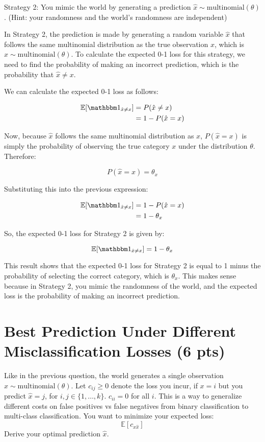 \documentclass[a4paper]{article}
\theoremstyle{definition}
\def\E{\mathbb E}
\def\ind{\mathbbm 1}
\newenvironment{soln}{
    \leavevmode\color{blue}\ignorespaces
}{}
\begin{document}
Strategy 2: You mimic the world by generating a prediction $\hat x \sim \mbox{multinomial}(\theta)$.  (Hint: your randomness and the world's randomness are independent)

\begin{soln}
    In Strategy 2, the prediction is made by generating a random variable $\hat x$ that follows the same multinomial distribution as the true observation $x$, which is $\hat x \sim \text{multinomial}(\theta)$. To calculate the expected 0-1 loss for this strategy, we need to find the probability of making an incorrect prediction, which is the probability that $\hat x \neq x$.

    We can calculate the expected 0-1 loss as follows:

    \[
    \begin{align*}
    \E[\ind_{\hat x \neq x}] &= P(\hat x \neq x) \\
    &= 1 - P(\hat x = x)
    \end{align*}
    \]

    Now, because $\hat x$ follows the same multinomial distribution as $x$, $P(\hat x = x)$ is simply the probability of observing the true category $x$ under the distribution $\theta$. Therefore:

    \[
    P(\hat x = x) = \theta_x
    \]

    Substituting this into the previous expression:

    \[
    \begin{align*}
    \E[\ind_{\hat x \neq x}] &= 1 - P(\hat x = x) \\
    &= 1 - \theta_x
    \end{align*}
    \]

    So, the expected 0-1 loss for Strategy 2 is given by:

    \[
    \E[\ind_{\hat x \neq x}] = 1 - \theta_x
    \]

    This result shows that the expected 0-1 loss for Strategy 2 is equal to 1 minus the probability of selecting the correct category, which is $\theta_x$. This makes sense because in Strategy 2, you mimic the randomness of the world, and the expected loss is the probability of making an incorrect prediction.

\end{soln}

\section{Best Prediction Under Different Misclassification Losses (6 pts)}
Like in the previous question, 
the world generates a single observation $x \sim \mbox{multinomial}(\theta)$.
Let $c_{ij} \ge 0$ denote the loss you incur, if $x=i$ but you predict $\hat x=j$, for $i,j \in \{1, \ldots, k\}$.
$c_{ii}=0$ for all $i$.
This is a way to generalize different costs on false positives vs false negatives from binary classification to multi-class classification.
You want to minimize your expected loss:
$$\E[c_{x \hat x}]$$
Derive your optimal prediction $\hat x$.
\end{document}
